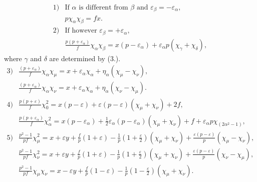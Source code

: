 \documentclass[11pt]{article}
\begin{document}
\[
\begin{array}{ll}
1)&\text{If }\alpha\text{ is different from }\beta\text{ and }\varepsilon_\beta=-\varepsilon_\alpha,\\[0.25em]
& p\chi_\alpha\chi_\beta=fx.\\[0.65em]
2)&\text{If however }\varepsilon_\beta=+\varepsilon_\alpha,\\[0.25em]
& \displaystyle \frac{p(p+\varepsilon_\alpha)}{f}\chi_\alpha\chi_\beta
=x(p-\varepsilon_\alpha)+\varepsilon_\alpha p(\chi_\gamma+\chi_\delta),
\end{array}
\]
where $\gamma$ and $\delta$ are determined by (3.).
\[
\begin{array}{ll}
3)&\displaystyle \frac{(p+\varepsilon_\alpha)}{f}\chi_\alpha\chi_\mu
=x+\varepsilon_\alpha\chi_\alpha+\eta_\alpha(\chi_\mu-\chi_\nu),\\[0.75em]
&\displaystyle \frac{(p+\varepsilon_\alpha)}{f}\chi_\alpha\chi_\nu
=x+\varepsilon_\alpha\chi_\alpha+\eta_\alpha(\chi_\nu-\chi_\mu).\\[0.75em]
4)&\displaystyle \frac{p(p+\varepsilon)}{f}\chi_0^2
=x(p-\varepsilon)+\varepsilon(p-\varepsilon)(\chi_\mu+\chi_\nu)+2f,\\[0.75em]
&\displaystyle \frac{p(p+\varepsilon_\alpha)}{f}\chi_\alpha^2
=x(p-\varepsilon_\alpha)+\frac12\varepsilon_\alpha(p-\varepsilon_\alpha)(\chi_\mu+\chi_\nu)+f+\varepsilon_\alpha p\chi_{(2\alpha^2-1)},\\[0.75em]
5)&\displaystyle \frac{p^2-1}{pf}\chi_\mu^2
=x+\varepsilon y+\frac{f}{p}(1+\varepsilon)-\frac1p\left(1+\frac{\varepsilon}{2}\right)(\chi_\mu+\chi_\nu)+\frac{\varepsilon(p-\varepsilon)}{p}(\chi_\mu-\chi_\nu),\\[0.75em]
&\displaystyle \frac{p^2-1}{pf}\chi_\nu^2
=x+\varepsilon y+\frac{f}{p}(1+\varepsilon)-\frac1p\left(1+\frac{\varepsilon}{2}\right)(\chi_\mu+\chi_\nu)+\frac{\varepsilon(p-\varepsilon)}{p}(\chi_\nu-\chi_\mu),\\[0.75em]
&\displaystyle \frac{p^2-1}{pf}\chi_\mu\chi_\nu
=x-\varepsilon y+\frac{f}{p}(1-\varepsilon)-\frac1p\left(1-\frac{\varepsilon}{2}\right)(\chi_\mu+\chi_\nu).
\end{array}
\]
\end{document}
